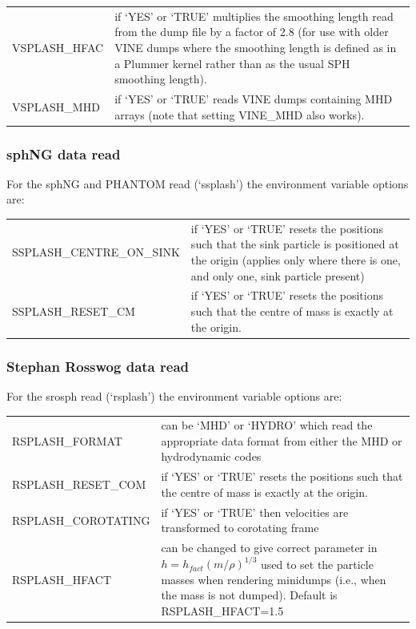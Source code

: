 \documentclass[a4paper,10pt]{article}
\begin{document}
\begin{tabular}{p{}p{}}
VSPLASH\_HFAC & if `YES' or `TRUE' multiplies the smoothing length read from the dump file by a factor of 2.8 (for use with older VINE dumps where the smoothing length is defined as in a Plummer kernel rather than as the usual SPH smoothing length). \\
VSPLASH\_MHD & if `YES' or `TRUE' reads VINE dumps containing MHD arrays (note that setting VINE\_MHD also works). \\
\end{tabular}

\subsubsection{ sphNG data read}
 For the sphNG and PHANTOM read (`ssplash') the environment variable options are:\newline

\begin{tabular}{p{}p{}}
SSPLASH\_CENTRE\_ON\_SINK & if `YES' or `TRUE' resets the positions such that the sink particle is positioned at the origin (applies only where there is one, and only one, sink particle present)\\
SSPLASH\_RESET\_CM & if `YES' or `TRUE' resets the positions such that the centre of mass is exactly at the origin.
\end{tabular}

\subsubsection{ Stephan Rosswog data read}
 For the srosph read (`rsplash') the environment variable options are:\newline

\begin{tabular}{p{}p{}}
RSPLASH\_FORMAT & can be `MHD' or `HYDRO' which read the appropriate data format from either the MHD or hydrodynamic codes \\
RSPLASH\_RESET\_COM & if `YES' or `TRUE' resets the positions such that the centre of mass is exactly at the origin. \\
RSPLASH\_COROTATING & if `YES' or `TRUE' then velocities are transformed to corotating frame \\
RSPLASH\_HFACT & can be changed to give correct parameter in $h=h_{fact}(m/\rho)^{1/3}$ used to set the particle masses when rendering minidumps (i.e., when the mass is not dumped). Default is RSPLASH\_HFACT=1.5
\end{tabular}
\end{document}
